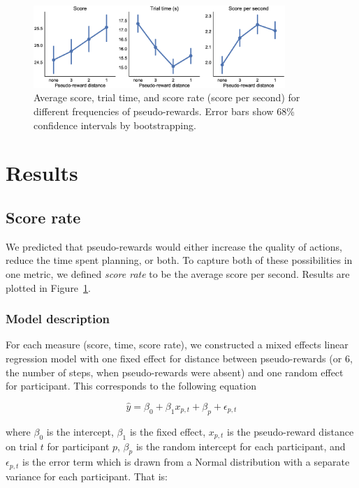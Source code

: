 \documentclass[10pt,letterpaper]{article}
\begin{document}
\begin{figure}[t!]
    \centering
    \includegraphics[width=0.85\textwidth]{figs/basic.eps}
    \caption{Average score, trial time, and score rate (score per second) for different frequencies of pseudo-rewards. Error bars show 68\% confidence intervals by bootstrapping.}
    \label{fig:basic}
\end{figure}

\section{Results}\label{results}

\subsection{Score rate}
We predicted that pseudo-rewards would either increase the quality of actions, reduce the time spent planning, or both. To capture both of these possibilities in one metric, we defined \emph{score rate} to be the average score per second. Results are plotted in Figure~\ref{fig:basic}.

\subsubsection{Model description}
For each measure (score, time, score rate), we constructed a mixed effects linear regression model with one fixed effect for distance between pseudo-rewards (or 6, the number of steps, when pseudo-rewards were absent) and one random effect for participant. This corresponds to the following equation

\begin{equation}
    \hat{y} = \beta_0 + \beta_1 x_{p,t} + \beta_p + \epsilon_{p,t}
\end{equation}

where $\beta_0$ is the intercept, $\beta_1$ is the fixed effect, $x_{p,t}$ is the pseudo-reward distance on trial $t$ for participant $p$, $\beta_p$ is the random intercept for each participant, and $\epsilon_{p,t}$ is the error term which is drawn from a Normal distribution with a separate variance for each participant. That is:
\end{document}
